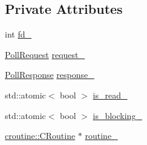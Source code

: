 \subsection*{Private Attributes}
\begin{DoxyCompactItemize}
\item 
int \hyperlink{classapollo_1_1cyber_1_1io_1_1PollHandler_a27290227ef927a9299dff726b8c3058f}{fd\-\_\-}
\item 
\hyperlink{structapollo_1_1cyber_1_1io_1_1PollRequest}{Poll\-Request} \hyperlink{classapollo_1_1cyber_1_1io_1_1PollHandler_a2115ffe4a901a60ff4d6ad036d67688b}{request\-\_\-}
\item 
\hyperlink{structapollo_1_1cyber_1_1io_1_1PollResponse}{Poll\-Response} \hyperlink{classapollo_1_1cyber_1_1io_1_1PollHandler_afcceaca4a6ad4d3c40407d40a21acc50}{response\-\_\-}
\item 
std\-::atomic$<$ bool $>$ \hyperlink{classapollo_1_1cyber_1_1io_1_1PollHandler_a7a5305d7ce1c7821bed181b40cbd20d9}{is\-\_\-read\-\_\-}
\item 
std\-::atomic$<$ bool $>$ \hyperlink{classapollo_1_1cyber_1_1io_1_1PollHandler_a3f00c1b8f8024207f125e5c05b156048}{is\-\_\-blocking\-\_\-}
\item 
\hyperlink{classapollo_1_1cyber_1_1croutine_1_1CRoutine}{croutine\-::\-C\-Routine} $\ast$ \hyperlink{classapollo_1_1cyber_1_1io_1_1PollHandler_a25783e7da986f5414a3d8120a391c16c}{routine\-\_\-}
\end{DoxyCompactItemize}


